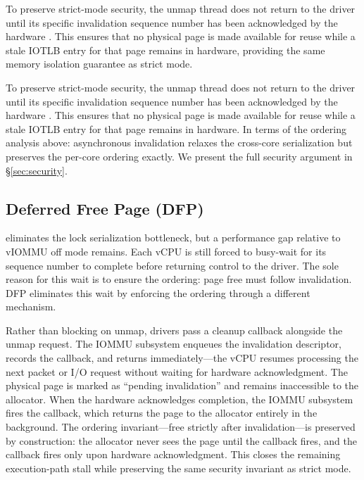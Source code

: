 To preserve strict-mode security, the unmap thread does not return to the driver until its specific invalidation sequence number has been acknowledged by the hardware . This ensures that no physical page is made available for reuse while a stale IOTLB entry for that page remains in hardware, providing the same memory isolation guarantee as strict mode.

To preserve strict-mode security, the unmap thread does not return to the driver until its specific invalidation sequence number has been acknowledged by the hardware . This ensures that no physical page is made available for reuse while a stale IOTLB entry for that page remains in hardware. In terms of the ordering analysis above: asynchronous invalidation relaxes the cross-core serialization but preserves the per-core ordering exactly. We present the full security argument in \S\ref{sec:security}. 

\subsection{Deferred Free Page (DFP)}

\optOneHeading eliminates the lock serialization bottleneck, but a performance gap relative to vIOMMU off mode remains. Each vCPU is still forced to busy-wait for its sequence number to complete before returning control to the driver. The sole reason for this wait is to ensure the ordering: page free must follow invalidation. DFP eliminates this wait by enforcing the ordering through a different mechanism. 

Rather than blocking on unmap, drivers pass a cleanup callback alongside the unmap request. The IOMMU subsystem enqueues the invalidation descriptor, records the callback, and returns immediately---the vCPU resumes processing the next packet or I/O request without waiting for hardware acknowledgment. The physical page is marked as ``pending invalidation'' and remains inaccessible to the allocator. When the hardware acknowledges completion, the IOMMU subsystem fires the callback, which returns the page to the allocator entirely in the background. The ordering invariant---free strictly after invalidation---is preserved by construction: the allocator never sees the page until the callback fires, and the callback fires only upon hardware acknowledgment. This closes the remaining execution-path stall while preserving the same security invariant as strict mode.


